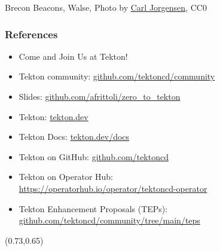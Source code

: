\documentclass[aspectratio=169,11pt,hyperref={colorlinks=true}]{beamer}
\begin{document}
\begin{sectionwithpiclargecentral}{Brecon Beacons, Walse, Photo by \href{https://unsplash.com/@scamartist}{\underline{Carl Jorgensen}}, CC0}
\end{sectionwithpiclargecentral}

\begin{blackframe}
  \frametitle{References}
  \begin{itemize}
    \item \large Come and Join Us at Tekton!
    \item \normalsize Tekton community: \href{https://github.com/tektoncd/community}{github.com/tektoncd/community} \\
  \end{itemize}
  \begin{itemize}
    \item Slides: \href{https://github.com/afrittoli/zero_to_tekton/blob/cnd2021/zero_to_tekton.pdf}{github.com/afrittoli/zero\_to\_tekton}
    \item Tekton: \href{https://tekton.dev}{tekton.dev}
    \item Tekton Docs: \href{https://tekton.dev/docs}{tekton.dev/docs}
    \item Tekton on GitHub: \href{https://github.com/tektoncd}{github.com/tektoncd}
    \item Tekton on Operator Hub:\\\href{https://https://operatorhub.io/operator/tektoncd-operator}{https://operatorhub.io/operator/tektoncd-operator}
    \item Tekton Enhancement Proposals (TEPs): \href{https://github.com/tektoncd/community/tree/main/teps\#tekton-enhancement-proposals-teps}{github.com/tektoncd/community/tree/main/teps}
  \end{itemize}
  \begin{textblock*}{0.13\paperwidth}(0.73\paperwidth,0.65\paperheight)
    
  \end{textblock*}
\end{blackframe}
\end{document}
